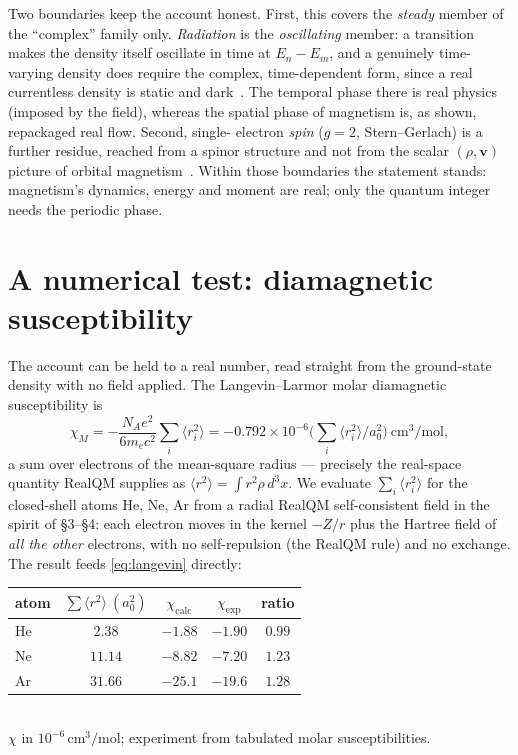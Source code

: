 \documentclass[11pt]{article}
\begin{document}
Two boundaries keep the account honest. First, this covers the \emph{steady} member of the ``complex'' family
only. \emph{Radiation} is the \emph{oscillating} member: a transition makes the density itself oscillate in
time at $E_n-E_m$, and a genuinely time-varying density does require the complex, time-dependent form, since a
real currentless density is static and dark~\cite{Spectra}. The temporal phase there is real physics (imposed
by the field), whereas the spatial phase of magnetism is, as shown, repackaged real flow. Second, single-%
electron \emph{spin} ($g=2$, Stern--Gerlach) is a further residue, reached from a spinor structure and not
from the scalar $(\rho,\mathbf v)$ picture of orbital magnetism~\cite{Magnetism}. Within those boundaries the
statement stands: magnetism's dynamics, energy and moment are real; only the quantum integer needs the periodic
phase.

\section{A numerical test: diamagnetic susceptibility}

The account can be held to a real number, read straight from the ground-state density with no field applied.
The Langevin--Larmor molar diamagnetic susceptibility is
\begin{equation}
\chi_M = -\frac{N_A e^2}{6 m_e c^2}\sum_i\langle r_i^2\rangle
       = -0.792\times10^{-6}\Big(\textstyle\sum_i\langle r_i^2\rangle/a_0^2\Big)\ \mathrm{cm^3/mol},
\label{eq:langevin}
\end{equation}
a sum over electrons of the mean-square radius --- precisely the real-space quantity RealQM supplies as
$\langle r^2\rangle=\int r^2\rho\,d^3x$. We evaluate $\sum_i\langle r_i^2\rangle$ for the closed-shell atoms He,
Ne, Ar from a radial RealQM self-consistent field in the spirit of \S3--\S4: each electron moves in the kernel
$-Z/r$ plus the Hartree field of \emph{all the other} electrons, with no self-repulsion (the RealQM rule) and no
exchange. The result feeds \eqref{eq:langevin} directly:

\begin{center}
\begin{tabular}{lcccc}
\hline
atom & $\sum\langle r^2\rangle\ (a_0^2)$ & $\chi_{\text{calc}}$ & $\chi_{\text{exp}}$ & ratio \\
\hline
He & $2.38$  & $-1.88$ & $-1.90$ & $0.99$ \\
Ne & $11.14$ & $-8.82$ & $-7.20$ & $1.23$ \\
Ar & $31.66$ & $-25.1$ & $-19.6$ & $1.28$ \\
\hline
\end{tabular}
\\[2pt]
{\small$\chi$ in $10^{-6}\,\mathrm{cm^3/mol}$; experiment from tabulated molar susceptibilities.}
\end{center}
\end{document}
